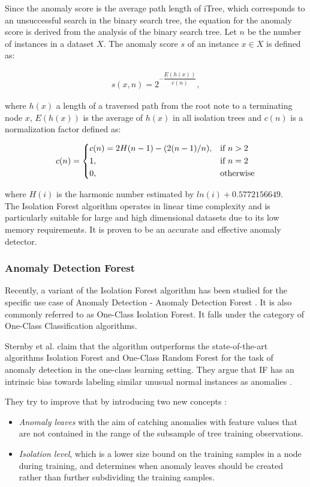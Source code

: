 Since the anomaly score is the average path length of iTree, which corresponds to an unsuccessful search in the binary search tree, the equation for the anomaly score is derived from the analysis of the binary search tree. Let $n$ be the number of instances in a dataset $X$. The anomaly score $s$ of an instance $x \in X$ is defined as:
 
 \begin{gather}
     s(x, n) = 2^{- \dfrac{E(h(x))}{c(n)}},
 \end{gather}
 
 where $h(x)$ a length of a traversed path from the root note to a terminating node $x$, $E(h(x))$ is the average of $h(x)$ in all isolation trees and $c(n)$ is a normalization factor defined as: 
 
 \[
 c(n) = 
  \begin{dcases}
     c(n) = 2H(n - 1) - (2(n - 1) / n), & \text{if } n > 2\\
     1, & \text{if } n = 2\\
     0, & \text{otherwise}
 \end{dcases} 
 \]
 
where $H(i)$ is the harmonic number estimated by $ln(i) + 0.5772156649$. \\

The Isolation Forest algorithm operates in linear time complexity and is particularly suitable for large and high dimensional datasets due to its low memory requirements. It is proven to be an accurate and effective anomaly detector.

\subsubsection*{Anomaly Detection Forest}
Recently, a variant of the Isolation Forest algorithm has been studied for the specific use case of Anomaly Detection - Anomaly Detection Forest \cite{adForest}. It is also commonly referred to as One-Class Isolation Forest. 
It falls under the category of One-Class Classification algorithms.

Sternby et al. claim that the algorithm outperforms the state-of-the-art algorithms Isolation Forest and One-Class Random Forest for the task of anomaly detection in the one-class learning setting. They argue that IF has an intrinsic bias towards labeling similar unusual normal instances as anomalies \cite{adForest}.

They try to improve that by introducing two new concepts \cite{adForest}:
\begin{itemize}
    \item \textit{Anomaly leaves} with the aim of catching anomalies with feature values that are not contained
            in the range of the subsample of tree training observations.
    \item \textit{Isolation level}, which is a lower size bound on the training samples in a node during training, and determines when anomaly leaves should be created rather than further subdividing the training samples.
\end{itemize}

